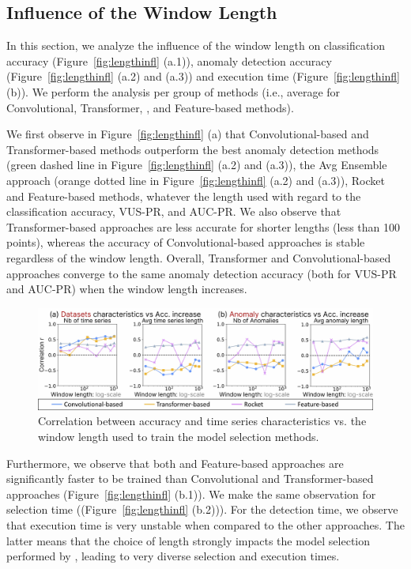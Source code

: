 \subsection{Influence of the Window Length}
\label{exp:windowlength}


In this section, we analyze the influence of the window length on classification accuracy (Figure~\ref{fig:lengthinfl} (a.1)), anomaly detection accuracy (Figure~\ref{fig:lengthinfl} (a.2) and (a.3)) and execution time (Figure~\ref{fig:lengthinfl} (b)). We perform the analysis per group of methods (i.e., average for Convolutional, Transformer, , and Feature-based methods).

We first observe in Figure~\ref{fig:lengthinfl} (a) that Convolutional-based and Transformer-based methods outperform the best anomaly detection methods (green dashed line in Figure~\ref{fig:lengthinfl} (a.2) and (a.3)), the Avg Ensemble approach (orange dotted line in Figure~\ref{fig:lengthinfl} (a.2) and (a.3)), Rocket and Feature-based methods, whatever the length used with regard to the classification accuracy, VUS-PR, and AUC-PR. We also observe that Transformer-based approaches are less accurate for shorter lengths (less than 100 points), whereas the accuracy of Convolutional-based approaches is stable regardless of the window length. Overall, Transformer and Convolutional-based approaches converge to the same anomaly detection accuracy (both for VUS-PR and AUC-PR) when the window length increases.

\begin{figure}
    \includegraphics[width=\linewidth]{figures/Fig9.jpg}
    \caption{Correlation between accuracy and time series characteristics vs. the window length used to train the model selection methods.}
    \label{fig:infl_charac}
\end{figure}

Furthermore, we observe that both  and Feature-based approaches are significantly faster to be trained than Convolutional and Transformer-based approaches (Figure~\ref{fig:lengthinfl} (b.1)). We make the same observation for selection time  ((Figure~\ref{fig:lengthinfl} (b.2))). For the detection time, we observe that  execution time is very unstable when compared to the other approaches. The latter means that the choice of length strongly impacts the model selection performed by , leading to very diverse selection and execution times.

